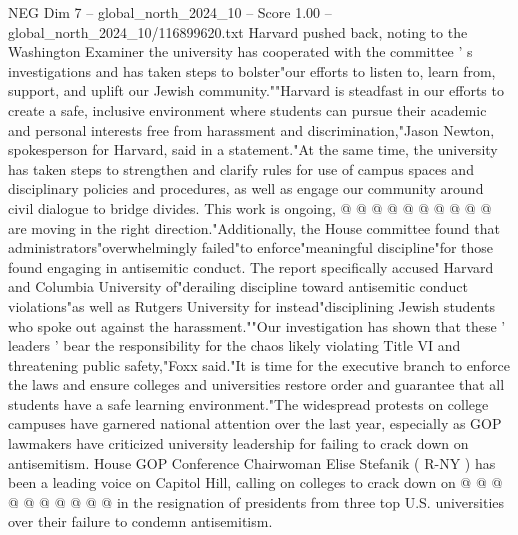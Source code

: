 \begin{textsample}{NEG Dim 7 – global\_north\_2024\_10 – Score 1.00 – global\_north\_2024\_10/116899620.txt}
Harvard pushed back, noting to the Washington Examiner the university has cooperated with the committee ' s investigations and has taken steps to bolster"our efforts to listen to, learn from, support, and uplift our Jewish community.""Harvard is steadfast in our efforts to create a safe, inclusive environment where students can pursue their academic and personal interests free from harassment and discrimination,"Jason Newton, spokesperson for Harvard, said in a statement."At the same time, the university has taken steps to strengthen and clarify rules for use of campus spaces and disciplinary policies and procedures, as well as engage our community around civil dialogue to bridge divides.
This work is ongoing, @ @ @ @ @ @ @ @ @ @ are moving in the right direction."Additionally, the House committee found that administrators"overwhelmingly failed"to enforce"meaningful discipline"for those found engaging in antisemitic conduct.
The report specifically accused Harvard and Columbia University of"derailing discipline toward antisemitic conduct violations"as well as Rutgers University for instead"disciplining Jewish students who spoke out against the harassment.""Our investigation has shown that these ' leaders ' bear the responsibility for the chaos likely violating Title VI and threatening public safety,"Foxx said."It is time for the executive branch to enforce the laws and ensure colleges and universities restore order and guarantee that all students have a safe learning environment."The widespread protests on college campuses have garnered national attention over the last year, especially as GOP lawmakers have criticized university leadership for failing to crack down on antisemitism.
House GOP Conference Chairwoman Elise Stefanik ( R-NY ) has been a leading voice on Capitol Hill, calling on colleges to crack down on @ @ @ @ @ @ @ @ @ @ in the resignation of presidents from three top U.S. universities over their failure to condemn antisemitism.

\end{textsample}
